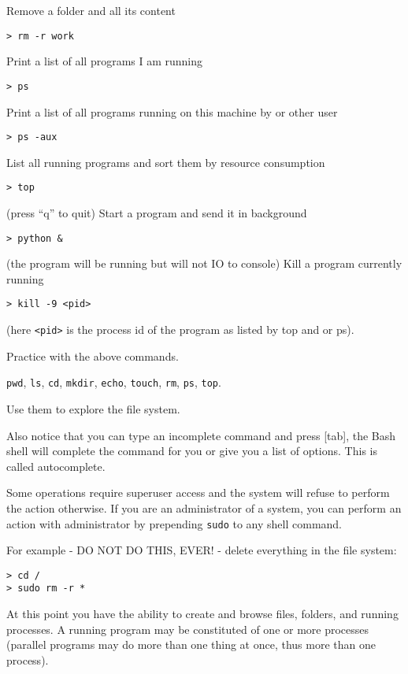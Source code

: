 \documentclass[justified,sixbynine]{tufte-book}
\def\ft{\small\tt}
\theoremstyle{plain}%
\theoremstyle{definition}
\theoremstyle{remark}
\begin{document}
\begin{fullwidth}
\noindent Remove a folder and all its content
\begin{lstlisting}
> rm -r work
\end{lstlisting}
\noindent Print a list of all programs I am running
\begin{lstlisting}
> ps
\end{lstlisting}
\noindent Print a list of all programs running on this machine by or other user
\begin{lstlisting}
> ps -aux
\end{lstlisting}
\noindent List all running programs and sort them by resource consumption
\begin{lstlisting}
> top
\end{lstlisting}
(press ``q'' to quit)
\noindent Start a program and send it in background
\begin{lstlisting}
> python &
\end{lstlisting}
(the program will be running but will not IO to console)
\noindent Kill a program currently running
\begin{lstlisting}
> kill -9 <pid>
\end{lstlisting}
(here {\ft <pid>} is the process id of the program as listed by top and or ps).

Practice with the above commands.

{\ft pwd}, {\ft ls}, {\ft cd}, {\ft mkdir}, {\ft echo}, {\ft touch}, {\ft rm}, {\ft ps}, {\ft top}.

Use them to explore the file system.

Also notice that you can type an incomplete command and press [tab], the Bash shell will complete the command for you or give you a list of options. This is called autocomplete.

Some operations require superuser access and the system will refuse to perform the action otherwise. If you are an administrator of a system, you can perform an action with administrator by prepending {\ft sudo} to any shell command.

For example - DO NOT DO THIS, EVER! - delete everything in the file system:
\begin{lstlisting}
> cd /
> sudo rm -r *
\end{lstlisting}

At this point you have the ability to create and browse files, folders, and running processes. A running program may be constituted of one or more processes (parallel programs may do more than one thing at once, thus more than one process).


\end{fullwidth}
\end{document}
